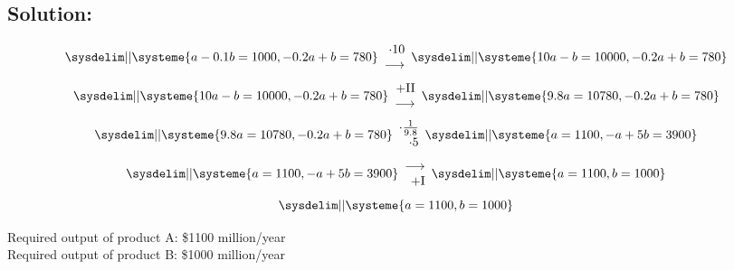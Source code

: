 \documentclass{article}
\begin{document}
\subsection*{Solution:}
\begin{equation*}
    \sysdelim||\systeme{
        a - 0.1b = 1000,
        -0.2a + b = 780
    }
    \begin{array}{rr}
        \cdot 10\\
        \longrightarrow \\
    \end{array}
    \sysdelim||\systeme{
        10a - b = 10000,
        -0.2a + b = 780
    }
\end{equation*}
\begin{equation*}
    \sysdelim||\systeme{
        10a - b = 10000,
        -0.2a + b = 780
    }
    \begin{array}{rr}
        + $II$\\
        \longrightarrow \\
    \end{array}
    \sysdelim||\systeme{
        9.8a = 10780,
        -0.2a + b = 780
    }
\end{equation*}
\begin{equation*}
    \sysdelim||\systeme{
        9.8a = 10780,
        -0.2a + b = 780
    }
    \begin{array}{rr}
        \cdot \frac{1}{9.8}\\
        \cdot 5\\
    \end{array}
    \sysdelim||\systeme{
        a = 1100,
        -a + 5b = 3900
    }
\end{equation*}
\begin{equation*}
    \sysdelim||\systeme{
        a = 1100,
        -a + 5b = 3900
    }
    \begin{array}{rr}
        \longrightarrow \\
        +$I$\\
    \end{array}
    \sysdelim||\systeme{
        a = 1100,
        b = 1000
    }
\end{equation*}
\begin{equation*}
    \sysdelim||\systeme{
        a = 1100,
        b = 1000
    }
\end{equation*}
\begin{center}Required output of product A: \$1100 million/year\\
Required output of product B: \$1000 million/year \end{center}
\end{document}

